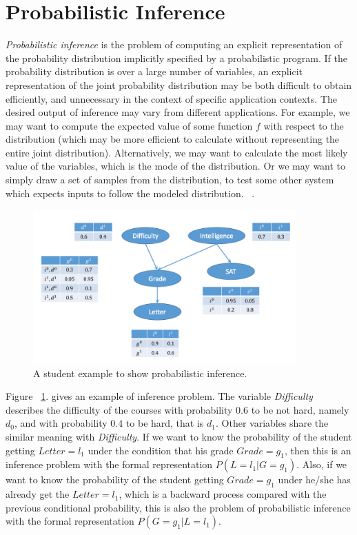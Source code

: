 \section{Probabilistic Inference}
\label{sec:inferintro}
\textit{Probabilistic inference} is the problem of computing an explicit representation of the probability distribution implicitly specified by a probabilistic program. If the probability distribution is over a large number of variables, an explicit representation of the joint probability distribution may be both difficult to obtain efficiently, and unnecessary in the context of specific application contexts. The desired output of inference may vary from different applications. For example, we may want to compute the expected value of some function $f$ with respect to the distribution (which may be more efficient to calculate without representing the entire joint distribution). Alternatively, we may want to calculate the most likely value of the variables, which is the mode of the distribution. Or we may want to simply draw a set of samples from the distribution, to test some other system which expects inputs to follow the modeled distribution. ~\cite{gordon2014}.

\begin{figure}
    \centering
    \includegraphics[width=0.9\textwidth]{figures/inference.png}
    \caption{A student example to show probabilistic inference.}
    \label{fig:infer_eg}
\end{figure}

Figure ~\ref{fig:infer_eg}. gives an example of inference problem. The variable \textit{Difficulty} describes the difficulty of the courses with probability $0.6$ to be not hard, namely $d_0$, and with probability $0.4$ to be hard, that is $d_1$. Other variables share the similar meaning with \textit{Difficulty}. If we want to know the probability of the student getting $Letter = l_1$ under the condition that his grade $Grade = g_1$, then this is an inference problem with the formal representation $P (L = l_1 | G = g_1)$. Also, if we want to know the probability of the student getting $Grade = g_1$ under he/she has already get the $Letter = l_1$, which is a backward process compared with the previous conditional probability, this is also the problem of probabilistic inference with the formal representation $P (G = g_1 | L = l_1)$.

